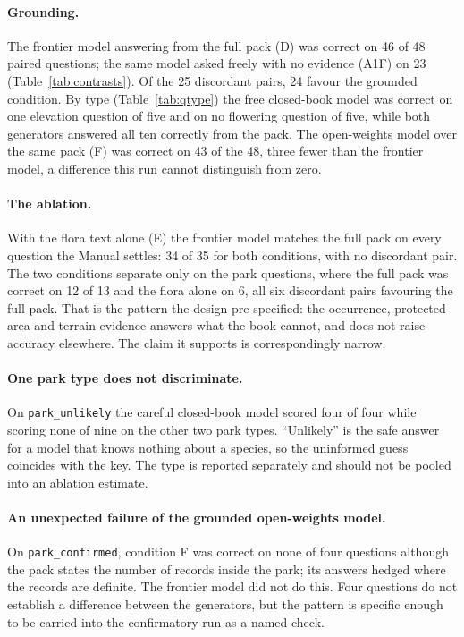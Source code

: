 \documentclass[11pt,a4paper]{article}
\newenvironment{prelim}{\par}{\par}
\newcommand{\vt}[1]{\texttt{#1}}          %
\begin{document}
\begin{prelim}
\paragraph{Grounding.} The frontier model answering from the full pack (D) was
correct on 46 of 48 paired questions; the same model asked freely with no evidence
(A1F) on 23 (Table~\ref{tab:contrasts}). Of the 25 discordant pairs, 24 favour the
grounded condition. By type (Table~\ref{tab:qtype}) the free closed-book model was
correct on one elevation question of five and on no flowering question of five,
while both generators answered all ten correctly from the pack. The open-weights
model over the same pack (F) was correct on 43 of the 48, three fewer than the
frontier model, a difference this run cannot distinguish from zero.

\paragraph{The ablation.} With the flora text alone (E) the frontier model matches
the full pack on every question the Manual settles: 34 of 35 for both conditions,
with no discordant pair. The two conditions separate only on the park questions,
where the full pack was correct on 12 of 13 and the flora alone on 6, all six
discordant pairs favouring the full pack. That is the pattern the design
pre-specified: the occurrence, protected-area and terrain evidence answers what the
book cannot, and does not raise accuracy elsewhere. The claim it supports is
correspondingly narrow.

\paragraph{One park type does not discriminate.} On \vt{park\_unlikely} the careful
closed-book model scored four of four while scoring none of nine on the other two
park types. ``Unlikely'' is the safe answer for a model that knows nothing about a
species, so the uninformed guess coincides with the key. The type is reported
separately and should not be pooled into an ablation estimate.

\paragraph{An unexpected failure of the grounded open-weights model.} On
\vt{park\_confirmed}, condition F was correct on none of four questions although the
pack states the number of records inside the park; its answers hedged where the
records are definite. The frontier model did not do this. Four questions do not
establish a difference between the generators, but the pattern is specific enough to
be carried into the confirmatory run as a named check.


\end{prelim}
\end{document}
